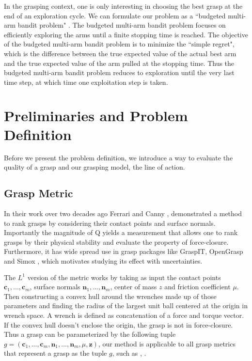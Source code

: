 \documentclass[letterpaper, 10 pt, conference]{ieeeconf}  %
\begin{document}
In the grasping context, one is only interesting in choosing the best grasp at the end of an exploration cycle.  We can formulate our problem as a   ``budgeted multi-arm bandit problem" \cite{madani2004budgeted}.
The budgeted multi-arm bandit problem focuses on efficiently exploring the arms until a finite stopping time is reached. 
The objective of the budgeted multi-arm bandit problem is to minimize the ``simple regret", which is the difference between the true expected value of the actual best arm and the true expected value of the arm pulled at the stopping time.
Thus the budgeted multi-arm bandit problem reduces to exploration until the very last time step, at which time one exploitation step is taken.


\section{Preliminaries and Problem Definition}
Before we present the problem definition, we introduce a way to evaluate the quality of a grasp and our grasping model, the line of action.

\subsection{Grasp Metric}
In their work over two decades ago Ferrari and Canny \cite{ferrari1992}, demonstrated a method to rank grasps by considering their contact points and surface normals. Importantly the magnitude of Q yields a measurement that allows one to rank grasps by their physical stability and evaluate the property of force-closure. Furthermore, it has wide spread use in grasp packages like GraspIT\cite{miller2004graspit}, OpenGrasp\cite{73} and Simox \cite{vahrenkamp2010simo}, which motivates studying its effect with uncertainties. 

The $L^1$ version of the metric works by taking as input the contact points $\textbf{c}_1,...,\textbf{c}_m$, surface normals $\textbf{n}_1,...,\textbf{n}_m$, center of mass $z$ and friction coefficient $\mu$. Then constructing a convex hull around the wrenches made up of those parameters and finding the radius of the largest unit ball centered at the origin in wrench space. A wrench is defined as concatenation of a force and torque vector.  If the convex hull doesn't enclose the origin, the grasp is not in force-closure. Thus a grasp can be parameterized by the following tuple $g = ( \textbf{c}_1,...,\textbf{c}_m,\textbf{n}_1,...,\textbf{n}_m,\mu, \textbf{z} )$, our method is applicable to all grasp metrics that represent a grasp as the tuple $g$, such as \cite{christopoulos2007handling}, \cite{li1988task}. 
\end{document}
